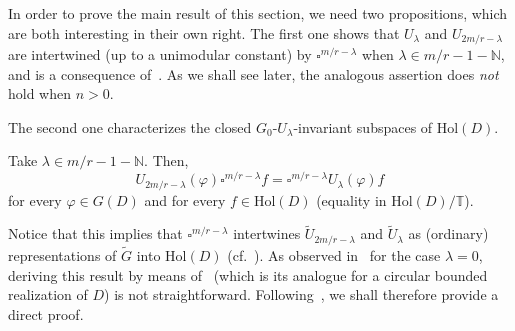 \documentclass[10.5pt,reqno]{amsart}
\newcommand{\Hol}{\mathrm{Hol}}
\newcommand{\N}{\mathds{N}}
\newcommand{\T}{\mathds{T}}
\renewcommand{\phi}{\varphi}
\begin{document}
In order to prove the main result of this section, we need two propositions, which are both interesting in their own right. 
The first one shows that $U_\lambda$ and $U_{2 m/r-\lambda}$  are intertwined (up to a unimodular constant) by $\square^{m/r-\lambda}$ when $\lambda\in m/r-1-\N$, and is a consequence of~\cite[Theorem 6.4]{Arazy}. 
As we shall see later, the analogous assertion does \emph{not} hold when $n>0$.

The second one characterizes the closed $G_0$-$U_\lambda$-invariant subspaces of $\Hol(D)$.

\begin{prop}\label{prop:4}
	Take $\lambda\in m/r-1-\N$. Then, 
	\[
	U_{2m/r-\lambda}(\phi)\square^{m/r-\lambda} f=\square^{m/r-\lambda} U_\lambda(\phi) f
	\]
	for every $\phi\in G(D)$ and for every $f\in \Hol(D)$ (equality  in $\Hol(D)/\T$).  
\end{prop}


Notice that this implies that $\square^{m/r-\lambda}$ intertwines $\widetilde U_{2 m/r-\lambda}$ and $\widetilde U_{\lambda}$   as (ordinary) representations of $\widetilde G$ into $\Hol(D)$ (cf.~\cite[Theorem 3.2]{Bargmann}). 
As observed in~\cite{Garrigos} for the case $\lambda=0$, deriving this result by means of~\cite[Theorem 6.4]{Arazy} (which is its analogue for a circular bounded realization of $D$) is not straightforward. Following~\cite{Garrigos}, we shall therefore provide a direct proof.
\end{document}
